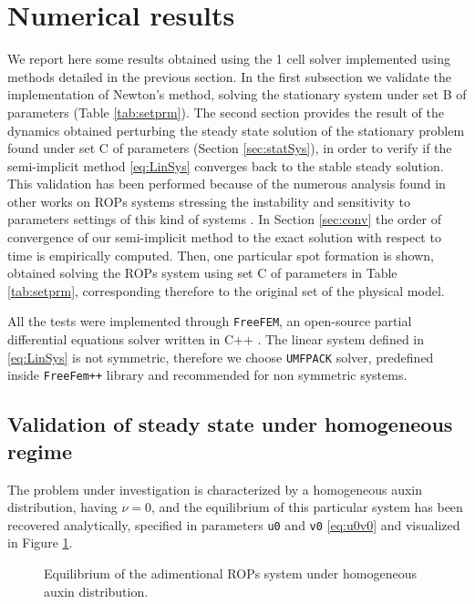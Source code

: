 \section{Numerical results}

We report here some results obtained using the 1 cell solver implemented using methods detailed in the previous section. In the first subsection we validate the implementation of Newton's method, solving the stationary system under set B of parameters (Table \ref{tab:setprm}). The second section provides the result of the dynamics obtained perturbing the steady state solution of the stationary problem found under set C of parameters (Section \ref{sec:statSys}), in order to verify if the semi-implicit method \eqref{eq:LinSys} converges back to the stable steady solution. This validation has been performed because of the numerous analysis found in other works on ROPs systems stressing the instability and sensitivity to parameters settings of this kind of systems \cite{intra2:14, intra2:7}. In Section \ref{sec:conv} the order of convergence of our semi-implicit method to the exact solution with respect to time is empirically computed. Then, one particular spot formation is shown, obtained solving the ROPs system using set C of parameters in Table \ref{tab:setprm}, corresponding therefore to the original set of the physical model.

All the tests were implemented through \verb|FreeFEM|, an open-source partial differential equations solver written in C++ \cite{freefem}. The linear system defined in \eqref{eq:LinSys} is not symmetric, therefore we choose \verb|UMFPACK| solver, predefined inside \verb|FreeFem++| library and recommended for non symmetric systems.

\subsection{Validation of steady state under homogeneous regime}\label{sec:ValidationNewton}
The problem under investigation is characterized by a homogeneous auxin distribution, having $\nu = 0$, and the equilibrium of this particular system has been recovered analytically, specified in parameters \verb|u0| and \verb|v0| \eqref{eq:u0v0} and visualized in Figure \ref{fig:u0v0}.
\begin{figure}[H]
    \centering
    \quad
    \caption[Equilibrium of homogeneous adimentional system]{Equilibrium of the adimentional ROPs system under homogeneous auxin distribution.}
    \label{fig:u0v0}
\end{figure}

